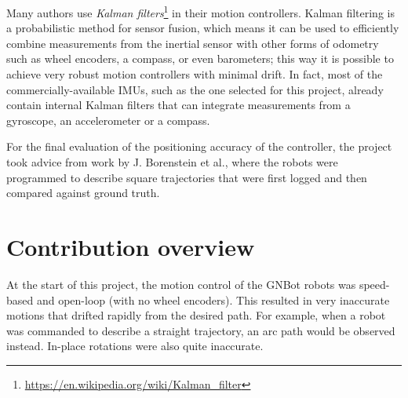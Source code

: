 \documentclass[12pt,twoside]{report}
\begin{document}
Many authors use \emph{Kalman filters}\footnote{\url{https://en.wikipedia.org/wiki/Kalman_filter}} in their motion controllers. Kalman filtering is a probabilistic method for sensor fusion, which means it can be used to efficiently combine measurements from the inertial sensor with other forms of odometry such as wheel encoders, a compass, or even barometers; this way it is possible to achieve very robust motion controllers with minimal drift\cite{PeiChunLin06,HyoungKiLee12,
HakyoungChung01,panich11}.
In fact, most of the commercially-available IMUs, such as the one selected for this project, already contain internal Kalman filters that can integrate measurements from a gyroscope, an accelerometer or a compass.



For the final evaluation of the positioning accuracy of the controller, the project took advice from work by J. Borenstein et al.\cite{HakyoungChung01,Borenstein98}, where the robots were programmed to describe square trajectories that were first logged and then compared against ground truth.





















\section{Contribution overview}


At the start of this project, the motion control of the GNBot robots was speed-based and open-loop (with no wheel encoders). This resulted in very inaccurate motions that drifted rapidly from the desired path. For example, when a robot was commanded to describe a straight trajectory, an arc path would be observed instead. In-place rotations were also quite inaccurate.
\end{document}

